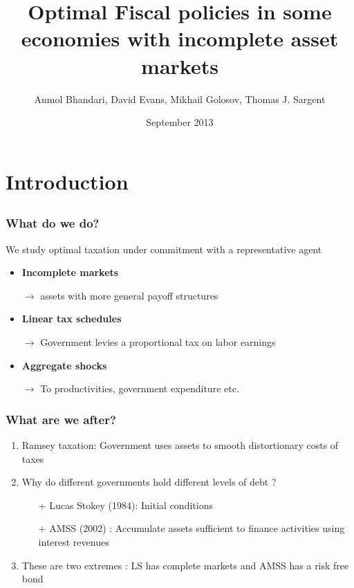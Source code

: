 \documentclass{beamer}
\title { Optimal Fiscal policies in some economies with incomplete asset markets}
\author{Anmol Bhandari, David Evans, Mikhail Golosov, Thomas J. Sargent}
\date{September 2013}
\begin{document}
%
\begin{frame}
\titlepage

\end{frame}
\section{Introduction}
\subsection{}
\begin{frame}
\frametitle{What do we do?}
We study optimal taxation under commitment with a representative agent
\begin{itemize}
 
 \item \textbf{Incomplete markets}

 \quad \color{red}$\rightarrow$ \color{black} assets with more general payoff structures

 \item \textbf{Linear tax schedules}

 \quad \color{red}$\rightarrow$ \color{black}Government levies a proportional tax on labor earnings 

 \item \textbf{Aggregate shocks}

 \quad \color{red}$\rightarrow$ \color{black} To productivities, government expenditure etc.

 \end{itemize}
\end{frame}



\begin{frame}
\frametitle{What are we after?}

\begin{enumerate}
\item Ramsey taxation: Government uses assets to smooth distortionary costs of taxes
\item Why do different governments hold different levels of debt ?
\begin{itemize}
 \item [+] Lucas Stokey (1984): Initial conditions
 \item [+ ] AMSS (2002) : Accumulate assets sufficient to finance activities using interest revenues
\end{itemize}
\item These are two extremes : LS has complete markets and AMSS has a risk free bond
\end{enumerate}
\end{frame}
\end{document}
